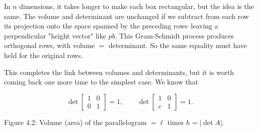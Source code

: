 In \(n\) dimensions, it takes longer to make each box rectangular, but the idea is the same. The volume and determinant are unchanged if we subtract from each row its projection onto the space spanned by the preceding rows--leaving a perpendicular "height vector" like \(pb\). This Gram-Schmidt process produces orthogonal rows, with volume \(=\) determinant. So the same equality must have held for the original rows.

This completes the link between volumes and determinants, but it is worth coming back one more time to the simplest case. We know that

\[\det\begin{bmatrix}1&0\\ 0&1\end{bmatrix}=1,\qquad\det\begin{bmatrix}1&0\\ c&1\end{bmatrix}=1.\]

Figure 4.2: Volume (area) of the parallelogram \(=\ell\) times \(h=|\det A|\).

 